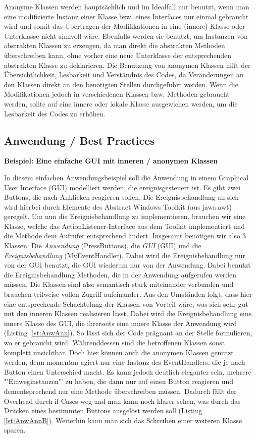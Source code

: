 Anonyme Klassen werden hauptsächlich und im Idealfall nur benutzt, wenn man eine modifizierte Instanz einer Klasse bzw. eines Interfaces nur einmal gebraucht wird und somit das Übertragen der Modifikationen in eine (innere) Klasse oder Unterklasse nicht sinnvoll wäre.
Ebenfalls werden sie benutzt, um Instanzen von abstrakten Klassen zu erzeugen, da man direkt die abstrakten Methoden überschreiben kann, ohne vorher eine neue Unterklasse der entsprechenden abstrakten Klasse zu deklarieren.
Die Benutzung von anonymen Klassen hilft der Übersichtlichkeit, Lesbarkeit und Verständnis des Codes, da Veränderungen an den Klassen direkt an den benötigten Stellen durchgeführt werden.
Wenn die Modifikationen jedoch in verschiedenen Klassen bzw. Methoden gebraucht werden, sollte auf eine innere oder lokale Klasse ausgewichen werden, um die Lesbarkeit des Codes zu erhöhen.
\newpage
\subsection{Anwendung / Best Practices}

{\bf Beispiel: Eine einfache GUI mit inneren / anonymen Klassen}

In diesem einfachen Anwendungsbeispiel soll die Anwendung in einem Graphical User Interface (GUI) modelliert werden, die ereignisgesteuert ist.
Es gibt zwei Buttons, die nach Anklicken reagieren sollen.
Die Ereignisbehandlung an sich wird hierbei durch Elemente des Abstract Windows Toolkit (aus jawa.awt) geregelt.
Um nun die Ereignisbehandlung zu implementieren, brauchen wir eine Klasse, welche das ActionListener-Interface aus dem Toolkit implementiert und die Methode dem Aufrufer entsprechend ändert.
Insgesamt benötigen wir also 3 Klassen: Die {\it Anwendung} (PressButtons), die {\it GUI} (GUI) und die {\it Ereignisbehandlung} (MyEventHandler). Dabei wird die Ereignisbehandlung nur von der GUI benutzt, die GUI wiederum nur von der Anwendung. Dabei benutzt die Ereignisbehandlung Methoden, die in der Anwendung aufgerufen werden müssen.
Die Klassen sind also semantisch stark miteinander verbunden und brauchen teilweise vollen Zugriff aufeinander.
Aus den Umständen folgt, dass hier eine entsprechende Schachtelung der Klassen von Vorteil wäre, was sich sehr gut mit den inneren Klassen realisieren lässt.
Dabei wird die Ereignisbehandlung eine innere Klasse des GUI, die ihrerseits eine innere Klasse der Anwendung wird (Listing \ref{lst:AnwAnn}).
So lässt sich der Code prägnant an der Stelle formulieren, wo er gebraucht wird.
Währenddessen sind die betroffenen Klassen sonst komplett unsichtbar.
Doch hier können auch die anonymen Klassen genutzt werden, denn momentan agiert nur eine Instanz des EventHandlers, die je nach Button einen Unterschied macht. Es kann jedoch deutlich eleganter sein, mehrere "'Einweginstanzen"' zu haben, die dann nur auf einen Button reagieren und dementsprechend nur eine Methode überschreiben müssen.
Dadurch fällt der Overhead durch if-Cases weg und man kann noch klarer sehen, was durch das Drücken eines bestimmten Buttons ausgelöst werden soll (Listing \ref{lst:AnwAnnB}). Weiterhin kann man sich das Schreiben einer weiteren Klasse sparen.
\\
\\

